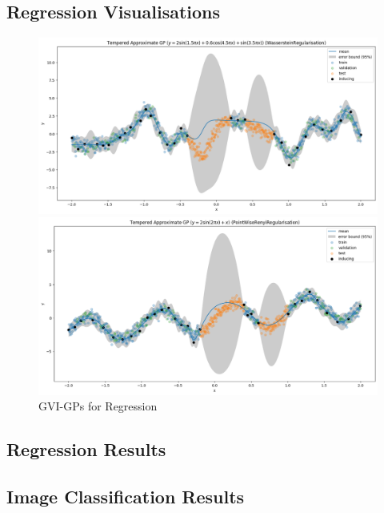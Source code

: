 \documentclass{article}
\numberwithin{equation}{section}
\begin{document}
\subsection{Regression Visualisations}
\begin{figure}[h!]
\centering
\begin{minipage}{.5\textwidth}
  \centering
  \includegraphics[width=0.9\linewidth]{experiments/regression/toy_curves/outputs/curve3/tempered-WassersteinRegularisation.png}
\end{minipage}%
\begin{minipage}{.5\textwidth}
  \centering
  \includegraphics[width=0.9\linewidth]{experiments/regression/toy_curves/outputs/curve4/tempered-PointWiseRenyiRegularisation.png}
\end{minipage}
\caption{GVI-GPs for Regression}
\end{figure}
\subsection{Regression Results}

\subsection{Image Classification Results}

\newpage
\end{document}
